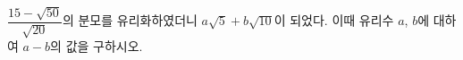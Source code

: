 $\dfrac{15-\sqrt{50}}{\sqrt{20}}$의 분모를 유리화하였더니 $a\sqrt{5}+b\sqrt{10}$이 되었다. 이때 유리수 $a$, $b$에 대하여 $a-b$의 값을 구하시오.
